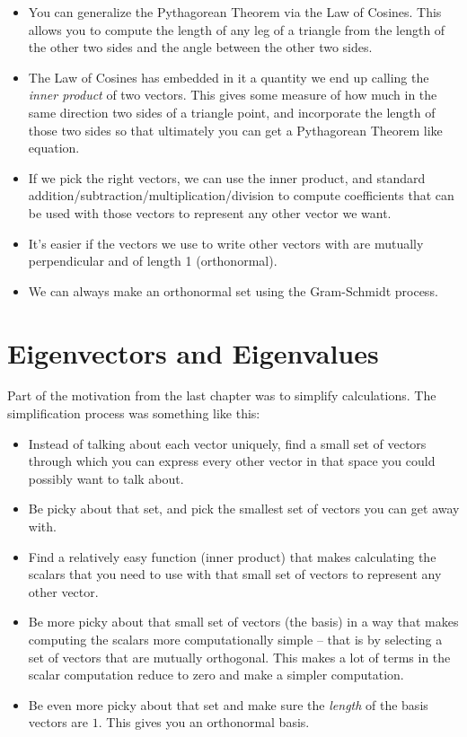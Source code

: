 \documentclass[
]{book}
\providecommand{\tightlist}{%
  \setlength{\itemsep}{0pt}\setlength{\parskip}{0pt}}
\begin{document}
\begin{itemize}
\tightlist
\item
  You can generalize the Pythagorean Theorem via the Law of Cosines. This allows you to compute the length of any leg of a triangle from the length of the other two sides and the angle between the other two sides.
\item
  The Law of Cosines has embedded in it a quantity we end up calling the \emph{inner product} of two vectors. This gives some measure of how much in the same direction two sides of a triangle point, and incorporate the length of those two sides so that ultimately you can get a Pythagorean Theorem like equation.
\item
  If we pick the right vectors, we can use the inner product, and standard addition/subtraction/multiplication/division to compute coefficients that can be used with those vectors to represent any other vector we want.
\item
  It's easier if the vectors we use to write other vectors with are mutually perpendicular and of length 1 (orthonormal).
\item
  We can always make an orthonormal set using the Gram-Schmidt process.
\end{itemize}

\hypertarget{eigenvectors-and-eigenvalues}{%
\chapter{Eigenvectors and Eigenvalues}\label{eigenvectors-and-eigenvalues}}

Part of the motivation from the last chapter was to simplify calculations. The simplification process was something like this:

\begin{itemize}
\tightlist
\item
  Instead of talking about each vector uniquely, find a small set of vectors through which you can express every other vector in that space you could possibly want to talk about.
\item
  Be picky about that set, and pick the smallest set of vectors you can get away with.
\item
  Find a relatively easy function (inner product) that makes calculating the scalars that you need to use with that small set of vectors to represent any other vector.
\item
  Be more picky about that small set of vectors (the basis) in a way that makes computing the scalars more computationally simple -- that is by selecting a set of vectors that are mutually orthogonal. This makes a lot of terms in the scalar computation reduce to zero and make a simpler computation.
\item
  Be even more picky about that set and make sure the \emph{length} of the basis vectors are \(1\). This gives you an orthonormal basis.
\end{itemize}
\end{document}
